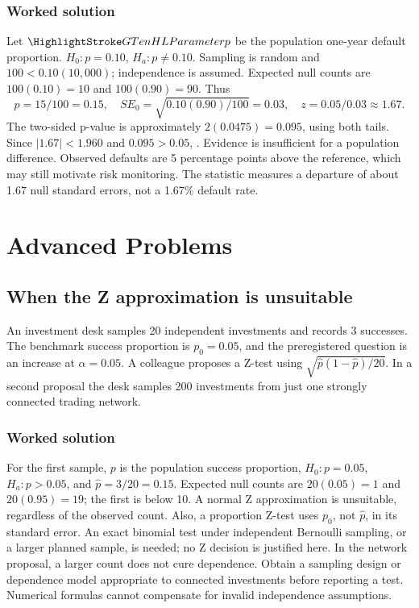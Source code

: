 \subsubsection*{Worked solution}\label{sol:default}
Let $\Pop{p}$ be the population one-year default proportion. $H_0:p=0.10$, $H_a:p\ne0.10$. Sampling is random and $100<0.10(10{,}000)$; independence is assumed. Expected null counts are $100(0.10)=10$ and $100(0.90)=90$. Thus
\[
\hat p=15/100=0.15,\quad SE_0=\sqrt{0.10(0.90)/100}=0.03,\quad z=0.05/0.03\approx1.67.
\]
The two-sided p-value is approximately $2(0.0475)=0.095$, using both tails. Since $|1.67|<1.960$ and $0.095>0.05$, . Evidence is insufficient for a population difference. Observed defaults are 5 percentage points above the reference, which may still motivate risk monitoring. The statistic measures a departure of about 1.67 null standard errors, not a 1.67\% default rate.
\section{Advanced Problems}\label{sec:advanced}
\subsection{When the Z approximation is unsuitable}\label{prob:limits}
An investment desk samples 20 independent investments and records 3 successes. The benchmark success proportion is $p_0=0.05$, and the preregistered question is an increase at $\alpha=0.05$. A colleague proposes a Z-test using $\sqrt{\hat p(1-\hat p)/20}$. In a second proposal the desk samples 200 investments from just one strongly connected trading network.
\subsubsection*{Worked solution}\label{sol:limits}
For the first sample, $p$ is the population success proportion, $H_0:p=0.05$, $H_a:p>0.05$, and $\hat p=3/20=0.15$. Expected null counts are $20(0.05)=1$ and $20(0.95)=19$; the first is below 10. A normal Z approximation is unsuitable, regardless of the observed count. Also, a proportion Z-test uses $p_0$, not $\hat p$, in its standard error. An exact binomial test under independent Bernoulli sampling, or a larger planned sample, is needed; no Z decision is justified here. In the network proposal, a larger count does not cure dependence. Obtain a sampling design or dependence model appropriate to connected investments before reporting a test. Numerical formulas cannot compensate for invalid independence assumptions.


